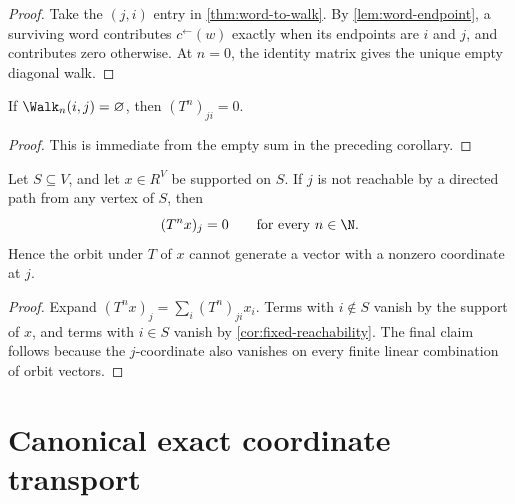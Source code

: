\begin{proof}
Take the $(j,i)$ entry in \cref{thm:word-to-walk}.  By
\cref{lem:word-endpoint}, a surviving word contributes
$c^\leftarrow(w)$ exactly when its endpoints are $i$ and $j$, and contributes
zero otherwise.  At $n=0$, the identity matrix gives the unique empty
diagonal walk.
\end{proof}

\begin{corollary}
\label{cor:fixed-reachability}
If $\Walk_n(i,j)=\varnothing$, then $(T^n)_{ji}=0$.
\end{corollary}

\begin{proof}
This is immediate from the empty sum in the preceding corollary.
\end{proof}

\begin{corollary}
\label{cor:orbit-reachability}
Let $S\subseteq V$, and let $x\in R^V$ be supported on $S$.  If $j$ is not
reachable by a directed path from any vertex of $S$, then
\[
  (T^nx)_j=0\qquad\text{for every }n\in\N.
\]
Hence the orbit under $T$ of $x$ cannot generate a vector with a nonzero
coordinate at $j$.
\end{corollary}

\begin{proof}
Expand $(T^nx)_j=\sum_i(T^n)_{ji}x_i$.  Terms with $i\notin S$ vanish by
the support of $x$, and terms with $i\in S$ vanish by
\cref{cor:fixed-reachability}.  The final claim follows because the
$j$-coordinate also vanishes on every finite linear combination of orbit
vectors.
\end{proof}

\section{Canonical exact coordinate transport}
\label{sec:canonical-transport}

